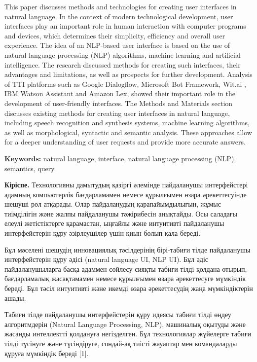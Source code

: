 This paper discusses methods and technologies for creating user
interfaces in natural language. In the context of modern technological
development, user interfaces play an important role in human interaction
with computer programs and devices, which determines their simplicity,
efficiency and overall user experience. The idea of an NLP-based user
interface is based on the use of natural language processing (NLP)
algorithms, machine learning and artificial intelligence. The research
discussed methods for creating such interfaces, their advantages and
limitations, as well as prospects for further development. Analysis of
TTI platforms such as Google Dialogflow, Microsoft Bot Framework, Wit.ai
, IBM Watson Assistant and Amazon Lex, showed their important role in
the development of user-friendly interfaces. The Methods and Materials
section discusses existing methods for creating user interfaces in
natural language, including speech recognition and synthesis systems,
machine learning algorithms, as well as morphological, syntactic and
semantic analysis. These approaches allow for a deeper understanding of
user requests and provide more accurate answers.

{\bfseries Keywords:} natural language, interface, natural language
processing (NLP), semantics, query.

{\bfseries Кіріспе.} Технологияны дамытудың қазіргі әлемінде пайдаланушы
интерфейстері адамның компьютерлік бағдарламамен немесе құрылғымен өзара
әрекеттесуінде шешуші рөл атқарады. Олар пайдаланудың қарапайымдылығын,
жұмыс тиімділігін және жалпы пайдаланушы тәжірибесін анықтайды. Осы
саладағы елеулі жетістіктерге қарамастан, ыңғайлы және интуитивті
пайдаланушы интерфейстерін құру әзірлеушілер үшін қиын болып қала
береді.

Бұл мәселені шешудің инновациялық тәсілдерінің бірі-табиғи тілде
пайдаланушы интерфейстерін құру әдісі (natural language UI, NLP UI). Бұл
әдіс пайдаланушыларға басқа адаммен сөйлесу сияқты табиғи тілді қолдана
отырып, бағдарламалық жасақтамамен немесе құрылғымен өзара әрекеттесуге
мүмкіндік береді. Бұл тәсіл интуитивті және икемді өзара әрекеттесудің
жаңа мүмкіндіктерін ашады.

Табиғи тілде пайдаланушы интерфейстерін құру идеясы табиғи тілді өңдеу
алгоритмдерін (Natural Language Processing, NLP), машиналық оқытуды және
жасанды интеллектті қолдануға негізделген. Бұл технологиялар жүйелерге
табиғи тілді түсінуге және түсіндіруге, сондай-ақ тиісті жауаптар мен
командаларды құруға мүмкіндік береді {[}1{]}.

